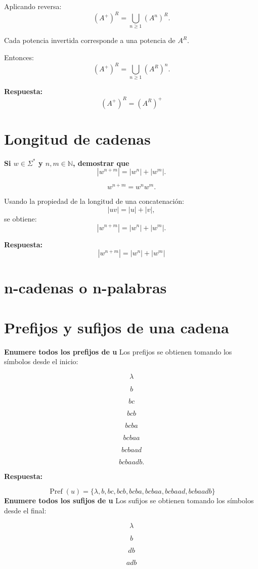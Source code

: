 \documentclass[12pt]{article}
\begin{document}
Aplicando reversa:
\[
(A^+)^R=
\bigcup_{n\geq1}(A^n)^R.
\]

Cada potencia invertida corresponde a una potencia de $A^R$.

Entonces:
\[
(A^+)^R=
\bigcup_{n\geq1}(A^R)^n.
\]

\textbf{Respuesta:}
\[
\boxed{(A^+)^R=(A^R)^+}
\]

\section{Longitud de cadenas}

\textbf{Si $w\in\Sigma^*$ y $n,m\in\mathbb N$, demostrar que
\[
|w^{n+m}|=|w^n|+|w^m|.
\]}

\[
w^{n+m}=w^nw^m.
\]

Usando la propiedad de la longitud de una concatenación:
\[
|uv|=|u|+|v|,
\]
se obtiene:
\[
|w^{n+m}|=|w^n|+|w^m|.
\]

\textbf{Respuesta:}
\[
\boxed{|w^{n+m}|=|w^n|+|w^m|}
\]

\section{n-cadenas o n-palabras}

\section{Prefijos y sufijos de una cadena}

\textbf{Enumere todos los prefijos de u}
Los prefijos se obtienen tomando los símbolos desde el inicio:

\[
\lambda
\]

\[
b
\]

\[
bc
\]

\[
bcb
\]

\[
bcba
\]

\[
bcbaa
\]

\[
bcbaad
\]

\[
bcbaadb.
\]

\textbf{Respuesta:}

\[
\boxed{
\operatorname{Pref}(u)=
\{\lambda,b,bc,bcb,bcba,bcbaa,bcbaad,bcbaadb\}
}
\]
\textbf{Enumere todos los sufijos de u}
Los sufijos se obtienen tomando los símbolos desde el final:

\[
\lambda
\]

\[
b
\]

\[
db
\]

\[
adb
\]
\end{document}
